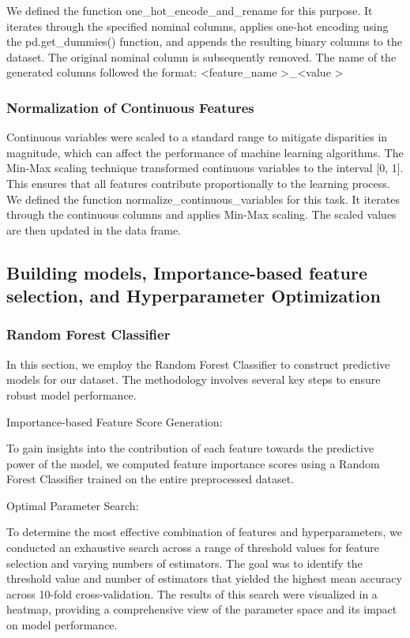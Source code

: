 \documentclass[journal,comsoc]{IEEEtran}
\begin{document}
We defined the function one\_hot\_encode\_and\_rename for this purpose. It iterates through the specified nominal columns, applies one-hot encoding using the pd.get\_dummies() function, and appends the resulting binary columns to the dataset. The original nominal column is subsequently removed. The name of the generated columns followed the format: \textless feature\_name \textgreater\_\textless value \textgreater

\subsubsection{Normalization of Continuous Features}

Continuous variables were scaled to a standard range to mitigate disparities in magnitude, which can affect the performance of machine learning algorithms. The Min-Max scaling technique transformed continuous variables to the interval [0, 1]. This ensures that all features contribute proportionally to the learning process.
We defined the function normalize\_continuous\_variables for this task. It iterates through the continuous columns and applies Min-Max scaling. The scaled values are then updated in the data frame.

\subsection{Building models, Importance-based feature selection, and Hyperparameter Optimization}
\subsubsection{Random Forest Classifier}

In this section, we employ the Random Forest Classifier to construct predictive models for our dataset. The methodology involves several key steps to ensure robust model performance.

Importance-based Feature Score Generation:

To gain insights into the contribution of each feature towards the predictive power of the model, we computed feature importance scores using a Random Forest Classifier trained on the entire preprocessed dataset.

Optimal Parameter Search:

To determine the most effective combination of features and hyperparameters, we conducted an exhaustive search across a range of threshold values for feature selection and varying numbers of estimators. The goal was to identify the threshold value and number of estimators that yielded the highest mean accuracy across 10-fold cross-validation. The results of this search were visualized in a heatmap, providing a comprehensive view of the parameter space and its impact on model performance.
\end{document}
